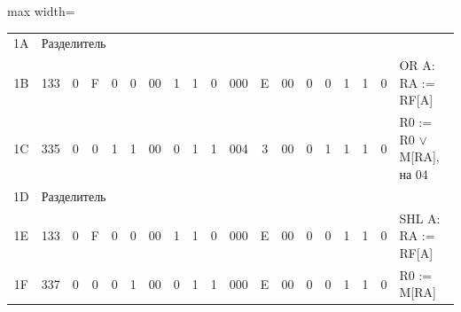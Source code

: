 \documentclass[11pt, a4paper]{article}
\begin{document}
{\begin{table}[h!]
\begin{adjustbox}{max width=\textwidth}
\begin{tabular}{|c|c|c|c|c|c|c|c|c|c|c|c|c|c|c|c|c|c|l|}
				1A          & \multicolumn{18}{l|}{Разделитель}                                                                                                                                                                                                                                                                                                                                                                                                                    \\
				1B          & 133                               & 0                                 & F                                      & 0                                      & 0             & 00          & 1                                       & 1                                     & 0                    & 000            & E             & 00         & 0          & 0            & 1           & 1            & 0           & OR A: RA := RF[A]              \\
				1C          & 335                               & 0                                 & 0                                      & 1                                      & 1             & 00          & 0                                       & 1                                     & 1                    & 004            & 3             & 00         & 0          & 1            & 1           & 1            & 0           & R0 := R0 $\vee$ M[RA], на 04   \\
				1D          & \multicolumn{18}{l|}{Разделитель}                                                                                                                                                                                                                                                                                                                                                                                                                    \\
				1E          & 133                               & 0                                 & F                                      & 0                                      & 0             & 00          & 1                                       & 1                                     & 0                    & 000            & E             & 00         & 0          & 0            & 1           & 1            & 0           & SHL A: RA := RF[A]             \\
				1F          & 337                               & 0                                 & 0                                      & 0                                      & 1             & 00          & 0                                       & 1                                     & 1                    & 000            & E             & 00         & 0          & 0            & 1           & 1            & 0           & R0 := M[RA]                    \\

\end{tabular}
\end{adjustbox}
\end{table}}
\end{document}
